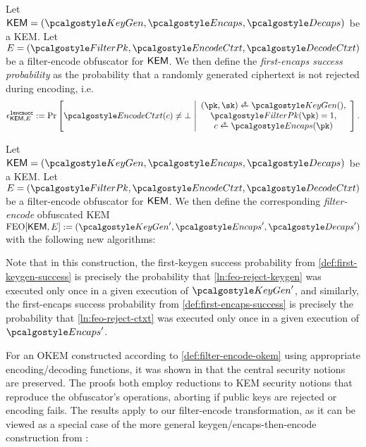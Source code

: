 \begin{definition}
\label{def:first-encaps-success}
    Let $\KEM = (\kgen, \encaps, \decaps)$ be a KEM.
    Let $E = (\filterpk, \encodectxt, \decodectxt)$ be a filter-encode obfuscator for $\mathsf{KEM}$.
    We then define the \emph{first-encaps success probability} as the probability that a randomly generated ciphertext is not rejected during encoding, i.e.
    \[
        \epsilon^\firstencapssuccess_{\KEM,E} :=
        \Pr\left[
            \encodectxt(c) \neq \bot
        ~\middle|
            \begin{array}{c}
                (\pk, \sk) \getsr \kgen(), \\
                \filterpk(\pk) = 1, \\
                c \getsr \encaps(\pk)
            \end{array}
        \right].
    \]
\end{definition}

\begin{definition}
\label{def:filter-encode-okem}
    Let $\KEM = (\kgen, \encaps, \decaps)$ be a KEM.
    Let $E = (\filterpk, \encodectxt, \decodectxt)$ be a filter-encode obfuscator for $\mathsf{KEM}$.
    We then define the corresponding \emph{filter-encode} obfuscated KEM $\feo[\KEM, E] := (\kgen', \encaps', \decaps')$ with the following new algorithms:

    
\end{definition}

Note that in this construction, the first-keygen success probability from \cref{def:first-keygen-success} is precisely the probability that \cref{ln:feo-reject-keygen} was executed only once in a given execution of $\kgen'$, and similarly, the first-encaps success probability from \cref{def:first-encaps-success} is precisely the probability that \cref{ln:feo-reject-ctxt} was executed only once in a given execution of $\encaps'$.

For an OKEM constructed according to \cref{def:filter-encode-okem} using appropriate encoding/decoding functions, it was shown in \cite[Theorems 2.12 and 2.13]{CCS:GunSteVei24} that the central security notions are preserved. The proofs both employ reductions to KEM security notions that reproduce the obfuscator's operations, aborting if public keys are rejected or encoding fails.
The results apply to our filter-encode transformation, as it can be viewed as a special case of the more general keygen/encaps-then-encode construction from \cite{CCS:GunSteVei24}:

